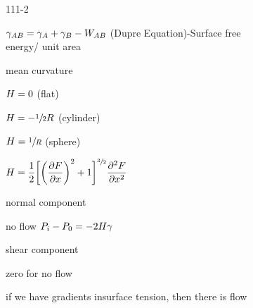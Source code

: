 \begin{mitframe}{111-2}
\begin{listone}
\begin{listtwo}
\begin{listthree}
                    \item $\gamma_{\helmholtz\exergy}=\gamma_{\helmholtz}+\gamma_{\exergy}-\work_{\helmholtz\exergy}$ (Dupre Equation)-Surface free \\energy/ unit area
                    	\begin{listfour}
                        	\item mean curvature
                            	\begin{listfive}
                                	\item $\enthalpy=0$ (flat)
                                    \item $\enthalpy=-\sfrac{1}{2}\gasconst$ (cylinder)
                                    \item $\enthalpy=\sfrac{1}{\gasconst}$ (sphere)
                                    \item $\enthalpy=\dfrac{1}{2}\bigg[\bigg(\dfrac{\partial\force}{\partial\disp}\bigg)^2+1\bigg]^{\sfrac{3}{2}}\dfrac{\partial^2\force}{\partial\disp^2}$
                                \end{listfive}
                        \end{listfour}
                \end{listthree}
			\item normal component
            	\begin{listthree}
                	\item no flow $\p_{\state}-\p_{\init}=-2\enthalpy\gamma$
                \end{listthree}
        	\item shear component
            	\begin{listthree}
                	\item zero for no flow
                    \item if we have gradients insurface tension, then there is flow
                \end{listthree}
        \end{listtwo}
    \end{listone}
\end{mitframe}